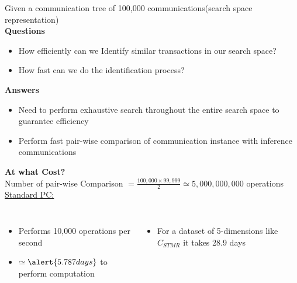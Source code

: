 \documentclass[11pt,aspectratio=169]{beamer}
\begin{document}
	\begin{frame}
		\small{
			Given a communication tree of 100,000 communications(search space representation)\\
			\textbf{Questions}\\
			\begin{itemize}
				\item How efficiently can we Identify similar transactions in our search space?
				\item How fast can we do the identification process? 
			\end{itemize}
		
		\textbf{Answers}\\
			\begin{itemize}
				\item Need to perform exhaustive search throughout the entire search space to guarantee efficiency
				
				\item Perform fast pair-wise comparison of communication instance with inference communications 
		
			\end{itemize}
		\textbf{At what Cost?}\\
		Number of pair-wise Comparison $= \frac{100,000 \times 99,999}{2}\simeq 5,000,000,000$ operations\\
		\underline{Standard PC:}
		\begin{columns}
			\begin{itemize}
				\item Performs 10,000 operations per second
				\item $\simeq \alert{5.787days}$ to perform computation 
			\end{itemize}
		\begin{itemize}
			\item For a dataset of 5-dimensions like $C_{STMR}$ it takes \alert{28.9 days} 
			
		\end{itemize}
		\end{columns}
		
	}
		
		
		
	\end{frame}	
	
\end{document}

